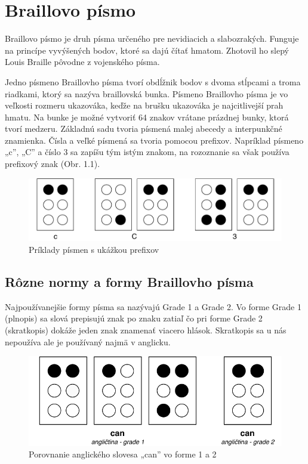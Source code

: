\documentclass{template/socthesis}
\begin{document}
\chapter{Braillovo písmo}
Braillovo písmo je druh písma určeného pre nevidiacich a slabozrakých. Funguje na princípe vyvýšených bodov, ktoré sa dajú čítať hmatom. Zhotovil ho slepý Louis Braille pôvodne z vojenského písma. 

Jedno písmeno Braillovho písma tvorí obdĺžnik bodov s dvoma stĺpcami a troma riadkami, ktorý sa nazýva braillovská bunka. Písmeno Braillovho písma je vo veľkosti rozmeru ukazováka, keďže na brušku ukazováka je najcitlivejší prah hmatu.
Na bunke je možné vytvoriť 64 znakov vrátane prázdnej bunky, ktorá tvorí medzeru. 
Základnú sadu tvoria písmená malej abecedy a interpunkčné znamienka. Čísla a veľké písmená sa tvoria pomocou prefixov.  Napríklad písmeno „c”,  „C” a číslo 3 sa zapíšu tým istým znakom, na rozoznanie sa však používa prefixový znak (Obr. 1.1).

\begin{center}
	\begin{figure}[!ht]
		\centering
		\includegraphics[scale=0.9]{braille}
		\caption{Príklady písmen s ukážkou prefixov}
	\end{figure}
\end{center}

\section{Rôzne normy a formy Braillovho písma}
Najpoužívanejšie formy písma sa nazývajú Grade 1 a Grade 2. Vo forme Grade 1 (plnopis) sa slová prepisujú znak po znaku zatiaľ čo pri forme Grade 2 (skratkopis) dokáže jeden znak znamenať viacero hlások. Skratkopis sa u nás nepoužíva ale je používaný najmä v anglicku.  

\begin{center}
	\begin{figure}[H]
		\centering
		\includegraphics[scale=1]{brailleGrades}
		\caption{Porovnanie anglického slovesa „can” vo forme 1 a 2}
	\end{figure}
\end{center}
\end{document}
